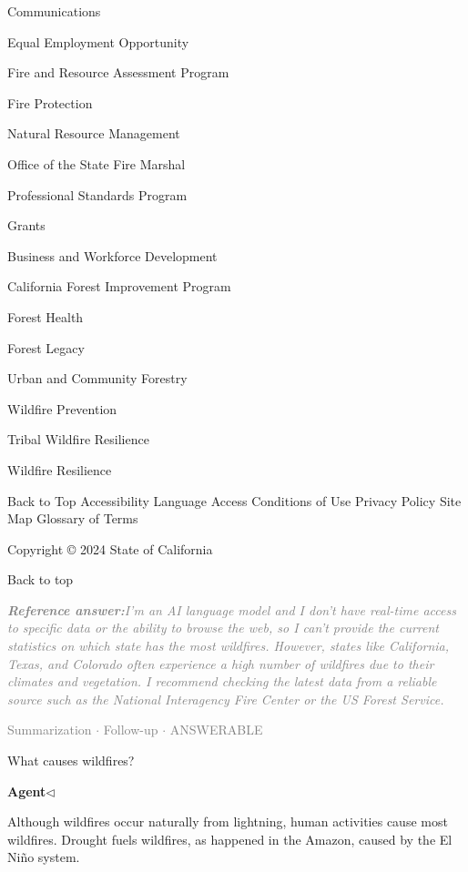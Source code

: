 \documentclass[a4paper,11pt]{article}
\begin{document}
\begin{docenv}
{Communications

Equal Employment Opportunity

Fire and Resource Assessment Program

Fire Protection

Natural Resource Management

Office of the State Fire Marshal

Professional Standards Program

Grants

Business and Workforce Development

California Forest Improvement Program

Forest Health

Forest Legacy

Urban and Community Forestry

Wildfire Prevention

Tribal Wildfire Resilience

Wildfire Resilience

Back to Top
Accessibility
Language Access
Conditions of Use
Privacy Policy
Site Map
Glossary of Terms


 Copyright © 2024 State of California
 

Back to top}
\end{docenv}
\begin{refanswerenv}
{\footnotesize\textit{\textcolor{gray}{\textbf{Reference answer:}\enspace I'm an AI language model and I don't have real-time access to specific data or the ability to browse the web, so I can't provide the current statistics on which state has the most wildfires. However, states like California, Texas, and Colorado often experience a high number of wildfires due to their climates and vegetation. I recommend checking the latest data from a reliable source such as the National Interagency Fire Center or the US Forest Service.}}}
\end{refanswerenv}
\vspace{0.5em}
\hfill{\tiny\textcolor{gray}{Summarization $\cdot$ Follow-up $\cdot$ ANSWERABLE}}
\begin{userbubble}
What causes wildfires?
\end{userbubble}
\noindent\hfill{\small\textcolor{agentcolor}{\textbf{Agent\enspace$\triangleleft$}}}
\begin{agentbubble}
Although wildfires occur naturally from lightning, human activities cause most wildfires. Drought fuels wildfires, as happened in the Amazon, caused by the El Niño system.
\end{agentbubble}
\end{document}
